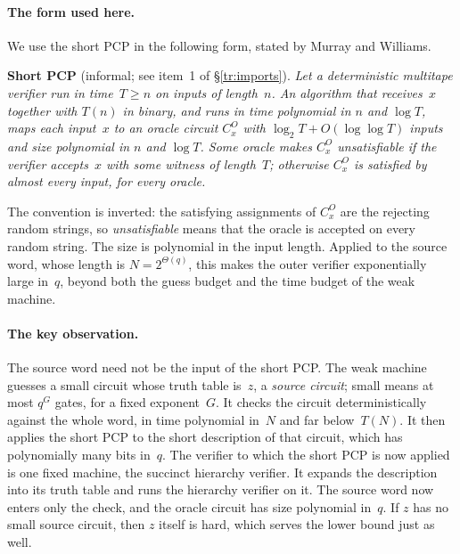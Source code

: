 \documentclass[11pt,letterpaper]{article}
\theoremstyle{definition}
\theoremstyle{remark}
\begin{document}
\paragraph{The form used here.} We use the short PCP in the following
form, stated by Murray and Williams.

\smallskip\noindent\textbf{Short PCP} (informal; see item~1 of
\S\ref{tr:imports}). \emph{Let a
deterministic multitape verifier run in time~$T\ge n$ on inputs of
length~$n$. An algorithm that receives~$x$ together with $T(n)$ in
binary, and runs in time polynomial in $n$
and $\log T$, maps each input~$x$ to an oracle circuit $C^O_x$ with
$\log_2T+O(\log\log T)$ inputs and size polynomial in $n$ and $\log T$. Some oracle makes $C^O_x$ unsatisfiable if the
verifier accepts~$x$ with some witness of length~$T$; otherwise $C^O_x$ is satisfied
by almost every input, for every oracle.}

\smallskip\noindent The convention is inverted: the satisfying
assignments of $C^O_x$ are the rejecting random strings, so
\emph{unsatisfiable} means that the oracle is accepted on every random
string. The size is polynomial in the input length. Applied
to the source word, whose length is $N=2^{\Theta(q)}$, this makes the
outer verifier exponentially large in~$q$, beyond both the guess budget
and the time budget of the weak machine.

\paragraph{The key observation.} The source word need not be the input
of the short PCP. The weak machine guesses a small circuit whose truth
table is~$z$, a \emph{source circuit}; small means at most $q^G$ gates,
for a fixed exponent~$G$. It checks the circuit deterministically
against the whole word, in time polynomial in~$N$ and far below~$T(N)$.
It then applies the short PCP to the short description of that
circuit, which has polynomially many bits in~$q$. The verifier to which
the short PCP is now applied is one fixed machine, the succinct
hierarchy verifier. It expands the description into its truth table
and runs the hierarchy verifier on it. The source word now enters only the check, and the oracle circuit
has size polynomial in~$q$. If $z$ has no small source circuit, then
$z$ itself is hard, which serves the lower bound just as well.
\end{document}
